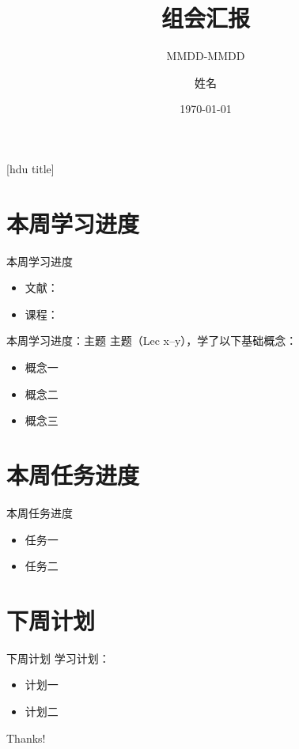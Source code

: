 \documentclass[aspectratio=1610]{ctexbeamer}
\title{组会汇报}
\subtitle{MMDD-MMDD}
\author{姓名}
\institute{杭州电子科技大学\quad XX学院}
\date{\today}
\begin{document}
{[hdu title]  %
\begin{frame}
  \titlepage
\end{frame}}

\begin{frame}
  \tableofcontents[sectionstyle=show,subsectionstyle=show/shaded/hide,subsubsectionstyle=show/shaded/hide]
\end{frame}

\section{本周学习进度}

\begin{frame}{本周学习进度}
  \begin{itemize}
    \item 文献：
    \item 课程：
  \end{itemize}
\end{frame}

\begin{frame}{本周学习进度：主题}
  主题（Lec x--y），学了以下基础概念：
  \begin{itemize}
    \item 概念一
    \item 概念二
    \item 概念三
  \end{itemize}
\end{frame}


\section{本周任务进度}

\begin{frame}{本周任务进度}
  \begin{itemize}
    \item 任务一
    \item 任务二
  \end{itemize}
\end{frame}

\section{下周计划}

\begin{frame}{下周计划}
  学习计划：
  \begin{itemize}
    \item 计划一
    \item 计划二
  \end{itemize}
\end{frame}

\begin{frame}
  \begin{center}
    {\Huge\calligra Thanks!}
  \end{center}
\end{frame}
\end{document}
